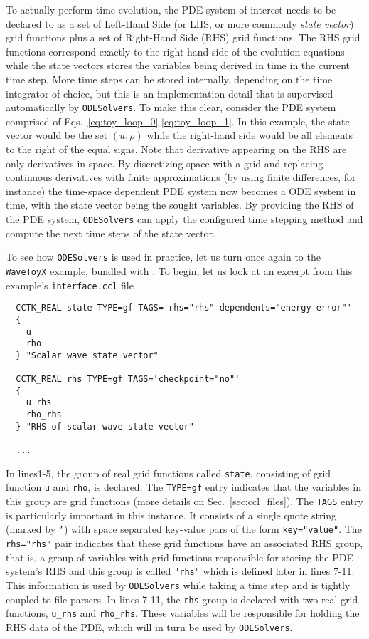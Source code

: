 To actually perform time evolution, the PDE system of interest needs to be declared to \Cactus\space as a set of Left-Hand Side (or LHS, or more commonly \textit{state vector}) grid functions plus a set of Right-Hand Side (RHS) grid functions. The RHS grid functions correspond exactly to the right-hand side of the evolution equations while the state vectors stores the variables being derived in time in the current time step. More time steps can be stored internally, depending on the time integrator of choice, but this is an implementation detail that is supervised automatically by \texttt{ODESolvers}. To make this clear, consider the PDE system comprised of Eqs.~\eqref{eq:toy_loop_0}-\eqref{eq:toy_loop_1}. In this example, the state vector would be the set $(u,\rho)$ while the right-hand side would be all elements to the right of the equal signs. Note that derivative appearing on the RHS are only derivatives in space. By discretizing space with a grid and replacing continuous derivatives with finite approximations (by using finite differences, for instance) the time-space dependent PDE system now becomes a ODE system in time, with the state vector being the sought variables. By providing the RHS of the PDE system, \texttt{ODESolvers} can apply the configured time stepping method and compute the next time steps of the state vector.

To see how \texttt{ODESolvers} is used in practice, let us turn once again to the \texttt{WaveToyX} example, bundled with \CarpetX. To begin, let us look at an excerpt from this example's \texttt{interface.ccl} file

\begin{lstlisting}
  CCTK_REAL state TYPE=gf TAGS='rhs="rhs" dependents="energy error"'
  {
    u
    rho
  } "Scalar wave state vector"

  CCTK_REAL rhs TYPE=gf TAGS='checkpoint="no"'
  {
    u_rhs
    rho_rhs
  } "RHS of scalar wave state vector"

  ...
\end{lstlisting}

In lines1-5, the group of real grid functions called \texttt{state}, consisting of grid function \texttt{u} and \texttt{rho}, is declared. The \texttt{TYPE=gf} entry indicates that the variables in this group are grid functions (more details on Sec.~\ref{sec:ccl_files}). The \texttt{TAGS} entry is particularly important in this instance. It consists of a single quote string (marked by \texttt{'}) with space separated key-value pars of the form \texttt{key="value"}. The \texttt{rhs="rhs"} pair indicates that these grid functions have an associated RHS group, that is, a group of variables with grid functions responsible for storing the PDE system's RHS and this group is called \texttt{"rhs"} which is defined later in lines 7-11. This information is used by \texttt{ODESolvers} while taking a time step and is tightly coupled to \Cactus\space file parsers. In lines 7-11, the \texttt{rhs} group is declared with two real grid functions, \texttt{u\_rhs} and \texttt{rho\_rhs}. These variables will be responsible for holding the RHS data of the PDE, which will in turn be used by \texttt{ODESolvers}.

